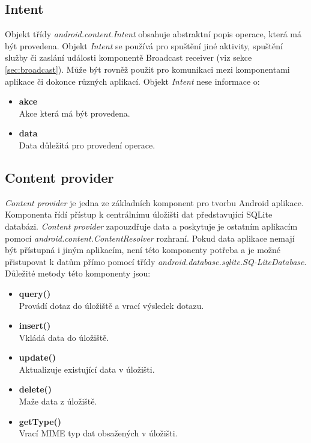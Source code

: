 \documentclass{diplomka}
\begin{document}
\subsection{Intent}
Objekt třídy \emph{android.content.Intent} obsahuje abstraktní popis operace, která má být provedena. Objekt \emph{Intent} se používá pro spuštění jiné aktivity, spuštění služby či zaslání události komponentě Broadcast receiver (viz sekce \ref{sec:broadcast}). Může být rovněž použit pro komunikaci mezi komponentami aplikace či dokonce různých aplikací. Objekt \emph{Intent} nese informace o:

\begin{itemize}[]
\item \textbf{akce}\\ Akce která má být provedena.
\item \textbf{data}\\ Data důležitá pro provedení operace.
\end{itemize}


\subsection{Content provider}
\emph{Content provider} je jedna ze základních komponent pro tvorbu Android aplikace. Komponenta řídí přístup k centrálnímu úložišti dat představující SQLite databázi. \emph{Content provider} zapouzdřuje data a poskytuje je ostatním aplikacím pomocí \emph{android.content.ContentResolver} rozhraní. Pokud data aplikace nemají být přístupná i jiným aplikacím, není této komponenty potřeba a je možné přistupovat k datům přímo pomocí třídy \emph{android.database.sqlite.SQ-LiteDatabase}. Důležité metody této komponenty jsou:

\begin{itemize}[]
\item \textbf{query()}\\
Provádí dotaz do úložiště a vrací výsledek dotazu.
\item \textbf{insert()}\\
Vkládá data do úložiště.
\item \textbf{update()}\\
Aktualizuje existující data v úložišti.
\item \textbf{delete()}\\
Maže data z úložiště.
\item \textbf{getType()}\\
Vrací MIME typ dat obsažených v úložišti.
\end{itemize}
\end{document}
